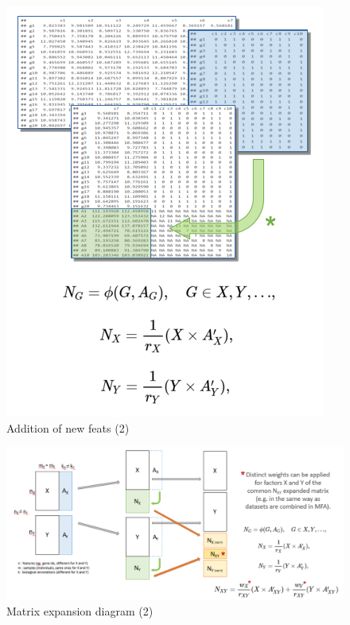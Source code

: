 \documentclass[a4paper, nobind]{templates/ociamthesis}
\begin{document}
\begin{figure}

{\centering \includegraphics[width=0.95\linewidth]{figures/chapter3/3-5_addition_of_new_feats_2} 

}

\caption{Addition of new feats (2)}\label{fig:fig3-5}
\end{figure}

\begin{figure}

{\centering \includegraphics[width=0.95\linewidth]{figures/chapter3/3-6_matrix_expansion_diagram_2} 

}

\caption{Matrix expansion diagram (2)}\label{fig:fig3-6}
\end{figure}
\end{document}
